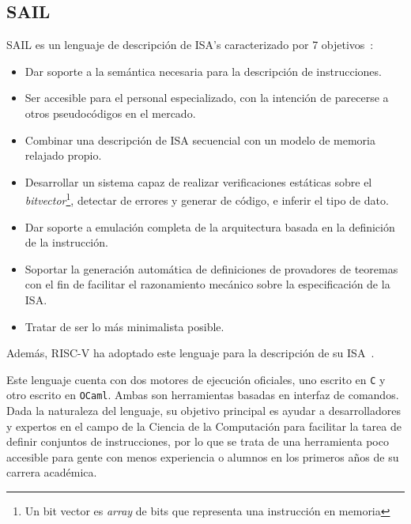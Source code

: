 \subsection{SAIL}

SAIL es un lenguaje de descripción de ISA's caracterizado por 7 objetivos~\cite{sail}: 
\begin{itemize}
    \item Dar soporte a la semántica necesaria para la descripción de instrucciones.
    \item Ser accesible para el personal especializado, con la intención de
    parecerse a otros pseudocódigos en el mercado.
    \item Combinar una descripción de ISA secuencial con un modelo de memoria relajado propio.
    \item Desarrollar un sistema capaz de realizar verificaciones estáticas
    sobre el \textit{bitvector}\footnote{Un bit vector es \textit{array} de
    bits que representa una instrucción en memoria}, detectar de errores y
    generar de código, e inferir el tipo de dato.
    \item Dar soporte a emulación completa de la arquitectura basada en la definición de la instrucción.
    \item Soportar la generación automática de definiciones de provadores de
    teoremas con el fin de facilitar el razonamiento mecánico sobre la
    especificación de la ISA\@.
    \item Tratar de ser lo más minimalista posible.
\end{itemize}

Además, RISC-V ha adoptado este lenguaje para la descripción de su
ISA~\cite{sail-riscv}.

Este lenguaje cuenta con dos motores de ejecución oficiales, uno escrito en
\texttt{C} y otro escrito en \texttt{OCaml}. Ambas son herramientas basadas en
interfaz de comandos. Dada la naturaleza del lenguaje, su objetivo principal es
ayudar a desarrolladores y expertos en el campo de la Ciencia de la
Computación para facilitar la tarea de definir conjuntos de
instrucciones, por lo que se trata de una herramienta poco accesible para gente
con menos experiencia o alumnos en los primeros años de su carrera académica.

